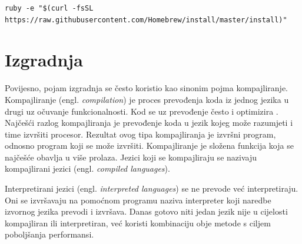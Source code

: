 \documentclass[times, utf8, diplomski, numeric]{fer}
\newcommand{\eng}[1]{(engl. \textit{#1})}
\begin{document}
\begin{lstlisting}[caption=Instalacija Homebrew alata, label=listing:homebrew]
ruby -e "$(curl -fsSL https://raw.githubusercontent.com/Homebrew/install/master/install)"
\end{lstlisting}

\section{Izgradnja} \label{header:Izgradnja}

Povijesno, pojam izgradnja se često koristio kao sinonim pojma kompajliranje. Kompajliranje \eng{compilation} je proces prevođenja koda iz jednog jezika u drugi uz očuvanje funkcionalnosti. Kod se uz prevođenje često i optimizira . Najčešći razlog kompajliranja je prevođenje koda u jezik kojeg može razumjeti i time izvršiti procesor. Rezultat ovog tipa kompajliranja je izvršni program, odnosno program koji se može izvršiti. Kompajliranje je složena funkcija koja se najčešće obavlja u više prolaza. Jezici koji se kompajliraju se nazivaju kompajlirani jezici \eng{compiled languages}.

Interpretirani jezici \eng{interpreted languages} se ne prevode već interpretiraju. Oni se izvršavaju na pomoćnom programu naziva interpreter koji naredbe izvornog jezika prevodi i izvršava. Danas gotovo niti jedan jezik nije u cijelosti kompajliran ili interpretiran, već koristi kombinaciju obje metode s ciljem poboljšanja performansi.
\end{document}
